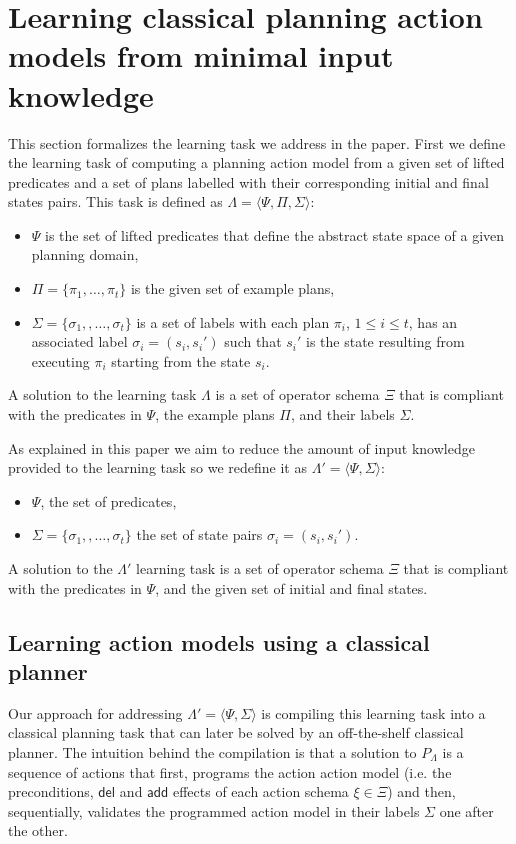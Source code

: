 \documentclass[letterpaper]{article} %
\newcommand{\tup}[1]{{\langle #1 \rangle}}
\newcommand{\del}{\mathsf{del}}     %
\newcommand{\add}{\mathsf{add}}     %
\begin{document}
\section{Learning classical planning action models from minimal input knowledge}
This section formalizes the learning task we address in the paper. First we define the learning task of computing a planning action model from a given set of lifted predicates and a set of plans labelled with their corresponding initial and final states pairs. This task is defined as $\Lambda=\tup{\Psi,\Pi,\Sigma}$: 
\begin{itemize}
\item $\Psi$ is the set of lifted predicates that define the abstract state space of a given planning domain,
\item $\Pi=\{\pi_1,\ldots,\pi_t\}$ is the given set of example plans,
\item $\Sigma=\{\sigma_1,,\ldots,\sigma_t\}$ is a set of labels with each plan $\pi_i$, {\small $1\leq i\leq t$}, has an associated label $\sigma_i=(s_i,s_i')$ such that $s_i'$ is the state resulting from executing $\pi_i$ starting from the state $s_i$. 
\end{itemize}

A solution to the learning task $\Lambda$ is a set of operator schema $\Xi$ that is compliant with the predicates in $\Psi$, the example plans $\Pi$, and their labels $\Sigma$.

As explained in this paper we aim to reduce the amount of input knowledge provided to the learning task so we redefine it as $\Lambda'=\tup{\Psi,\Sigma}$: 
\begin{itemize}
\item $\Psi$, the set of predicates,
\item $\Sigma=\{\sigma_1,,\ldots,\sigma_t\}$ the set of state pairs $\sigma_i=(s_i,s_i')$. 
\end{itemize}
A solution to the $\Lambda'$ learning task is a set of operator schema $\Xi$ that is compliant with the predicates in $\Psi$, and the given set of initial and final states.


\subsection{Learning action models using a classical planner}
Our approach for addressing $\Lambda'=\tup{\Psi,\Sigma}$ is compiling this learning task into a classical planning task that can later be solved by an off-the-shelf classical planner. The intuition behind the compilation is that a solution to $P_{\Lambda}$ is a sequence of actions that first, programs the action action model (i.e. the preconditions, $\del$ and $\add$ effects of each action schema $\xi\in\Xi$) and then, sequentially, validates the programmed action model in their labels $\Sigma$ one after the other.
\end{document}
